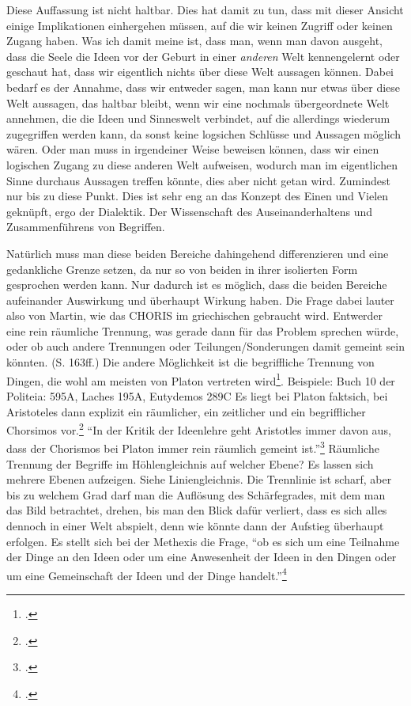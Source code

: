 \documentclass[12pt]{article}
\begin{document}
Diese Auffassung ist nicht haltbar. Dies hat damit zu tun, dass mit dieser Ansicht einige Implikationen einhergehen müssen, auf die wir keinen Zugriff oder keinen Zugang haben. Was ich damit meine ist, dass man, wenn man davon ausgeht, dass die Seele die Ideen vor der Geburt in einer \emph{anderen} Welt kennengelernt oder geschaut hat, dass wir eigentlich nichts über diese Welt aussagen können. Dabei bedarf es der Annahme, dass wir entweder sagen, man kann nur etwas über diese Welt aussagen, das haltbar bleibt, wenn wir eine nochmals übergeordnete Welt annehmen, die die Ideen und Sinneswelt verbindet, auf die allerdings wiederum zugegriffen werden kann, da sonst keine logsichen Schlüsse und Aussagen möglich wären. Oder man muss in irgendeiner Weise beweisen können, dass wir einen logischen Zugang zu diese anderen Welt aufweisen, wodurch man im eigentlichen Sinne durchaus Aussagen treffen könnte, dies aber nicht getan wird. Zumindest nur bis zu diese Punkt.
Dies ist sehr eng an das Konzept des Einen und Vielen geknüpft, ergo der Dialektik. Der Wissenschaft des Auseinanderhaltens und Zusammenführens von Begriffen.

Natürlich muss man diese beiden Bereiche dahingehend differenzieren und eine gedankliche Grenze setzen, da nur so von beiden in ihrer isolierten Form gesprochen werden kann. Nur dadurch ist es möglich, dass die beiden Bereiche aufeinander Auswirkung und überhaupt Wirkung haben.
Die Frage dabei lauter also von Martin, wie das CHORIS im griechischen gebraucht wird. Entwerder eine rein räumliche Trennung, was gerade dann für das Problem sprechen würde, oder ob auch andere Trennungen oder Teilungen/Sonderungen damit gemeint sein könnten. (S. 163ff.)
Die andere Möglichkeit ist die begriffliche Trennung von Dingen, die wohl am meisten von Platon vertreten wird\footcite[vgl.][S. 165]{Martin73}. Beispiele: Buch 10 der Politeia: 595A, Laches 195A, Eutydemos 289C
Es liegt bei Platon faktsich, bei Aristoteles dann explizit ein räumlicher, ein zeitlicher und ein begrifflicher Chorsimos vor.\footcite[vgl.][S. 166]{Martin73}
\enquote{In der Kritik der Ideenlehre geht Aristotles immer davon aus, dass der Chorismos bei Platon immer rein räumlich gemeint ist.}\footcite[][S. 166]{Martin73}
Räumliche Trennung der Begriffe im Höhlengleichnis auf welcher Ebene? Es lassen sich mehrere Ebenen aufzeigen. Siehe Liniengleichnis. Die Trennlinie ist scharf, aber bis zu welchem Grad darf man die Auflösung des Schärfegrades, mit dem man das Bild betrachtet, drehen, bis man den Blick dafür verliert, dass es sich alles dennoch in einer Welt abspielt, denn wie könnte dann der Aufstieg überhaupt erfolgen.
Es stellt sich bei der Methexis die Frage, \enquote{ob es sich um eine Teilnahme der Dinge an den Ideen oder um eine Anwesenheit der Ideen in den Dingen oder um eine Gemeinschaft der Ideen und der Dinge handelt.}\footcite[vgl.][S. 170]{Martin73}
\end{document}
